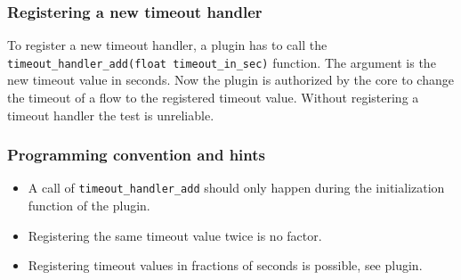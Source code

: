 \documentclass[documentation]{subfiles}
\begin{document}
\subsubsection{Registering a new timeout handler}
To register a new timeout handler, a plugin has to call the {\tt timeout\_handler\_add(float timeout\_in\_sec)} function. The argument is the new timeout value in seconds. Now the plugin is authorized by the core to change the timeout of a flow to the registered timeout value. Without registering a timeout handler the test is unreliable.

\subsubsection{Programming convention and hints}
\begin{itemize}
    \item A call of {\tt timeout\_handler\_add} should only happen during the initialization function of the plugin.
    \item Registering the same timeout value twice is no factor.
    \item Registering timeout values in fractions of seconds is possible, see  plugin.
\end{itemize}
\end{document}
